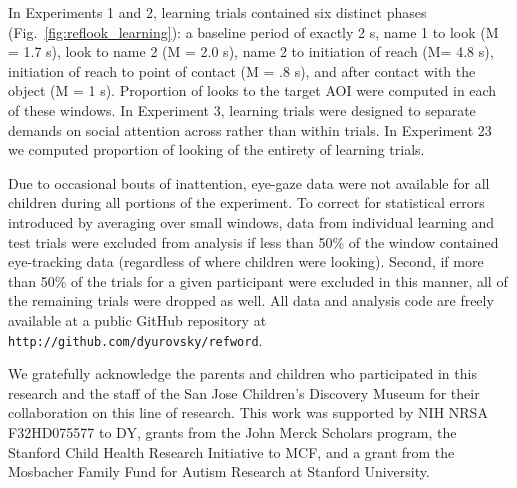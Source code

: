 \documentclass{pnastwo}
\begin{document}
\begin{article}
\begin{materials}
In Experiments 1 and 2, learning trials contained six distinct phases (Fig.~\ref{fig:reflook_learning}): a baseline period of exactly 2 s, name 1 to look (M = 1.7 s), look to name 2 (M = 2.0 s), name 2 to initiation of reach (M= 4.8 s), initiation of reach to point of contact (M = .8 s), and after contact with the object (M = 1 s). Proportion of looks to the target AOI were computed in each of these windows. In Experiment 3, learning trials were designed to separate demands on social attention across rather than within trials. In Experiment 23 we computed proportion of looking of the entirety of learning trials.

Due to occasional bouts of inattention, eye-gaze data were not available for all children during all portions of the experiment. To correct for statistical errors introduced by averaging over small windows, data from individual learning and test trials were excluded from analysis if less than 50\% of the window contained eye-tracking data (regardless of where children were looking). Second, if more than 50\% of the trials for a given participant were excluded in this manner, all of the remaining trials were dropped as well. All data and analysis code are freely available at a public GitHub repository at \small{\tt{http://github.com/dyurovsky/refword}}.

\end{materials}

\begin{acknowledgments}
We gratefully acknowledge the parents and children who participated in this research and the staff of the San Jose Children's Discovery Museum for their collaboration on this line of research. This work was supported by NIH NRSA F32HD075577 to DY, grants from the John Merck Scholars program, the Stanford Child Health Research Initiative to MCF, and a grant from the Mosbacher Family Fund for Autism Research at Stanford University.
\end{acknowledgments}


\linespread{.8}\selectfont


\end{article}
\end{document}
